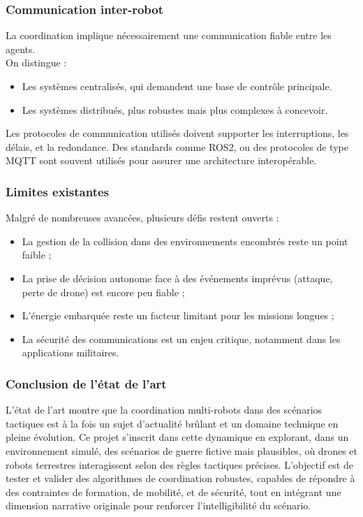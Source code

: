 \documentclass[a4paper,12pt]{article}
\begin{document}
\subsubsection*{Communication inter-robot}

La coordination implique nécessairement une communication fiable entre les agents. \\
On distingue :
\begin{itemize}
    \item Les systèmes centralisés, qui demandent une base de contrôle principale.
    \item Les systèmes distribués, plus robustes mais plus complexes à concevoir.
\end{itemize}

Les protocoles de communication utilisés doivent supporter les interruptions, les délais, et la redondance. Des standards comme ROS2, ou des protocoles de type MQTT sont souvent utilisés pour assurer une architecture interopérable.

\subsubsection*{Limites existantes}

Malgré de nombreuses avancées, plusieurs défis restent ouverts :

\begin{itemize}
    \item La gestion de la collision dans des environnements encombrés reste un point faible ;
    \item La prise de décision autonome face à des événements imprévus (attaque, perte de drone) est encore peu fiable ;
    \item L’énergie embarquée reste un facteur limitant pour les missions longues ;
    \item La sécurité des communications est un enjeu critique, notamment dans les applications militaires.
\end{itemize}

\subsubsection*{Conclusion de l'état de l'art}

L’état de l’art montre que la coordination multi-robots dans des scénarios tactiques est à la fois un sujet d’actualité brûlant et un domaine technique en pleine évolution. Ce projet s’inscrit dans cette dynamique en explorant, dans un environnement simulé, des scénarios de guerre fictive mais plausibles, où drones et robots terrestres interagissent selon des règles tactiques précises. L’objectif est de tester et valider des algorithmes de coordination robustes, capables de répondre à des contraintes de formation, de mobilité, et de sécurité, tout en intégrant une dimension narrative originale pour renforcer l’intelligibilité du scénario.
\end{document}
